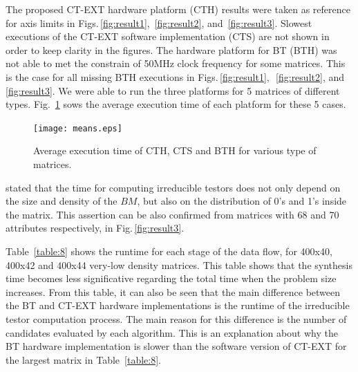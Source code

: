 \documentclass[authoryear,preprint,review,12pt]{elsarticle}
\begin{document}
The proposed CT-EXT hardware platform (CTH) results were taken as reference for axis limits in 
Figs.\,\ref{fig:result1}, \,\ref{fig:result2}, and \,\ref{fig:result3}.
Slowest executions of the CT-EXT software implementation (CTS) are not shown in order to keep clarity in 
the figures. 
The hardware platform for BT (BTH) was not able to met the constrain of 50MHz clock frequency for some 
matrices. 
This is the case for all missing BTH executions in Figs.\,\ref{fig:result1},~\,\ref{fig:result2}, and~\,\ref{fig:result3}. We were able to run the three platforms for 5 matrices of different types. 
Fig.~\ref{fig:means} sows the average execution time of each platform for these 5 cases.

\begin{figure}[htb]
    \begin{center}
       \texttt{[image: means.eps]}
    \end{center}
\caption{Average execution time of CTH, CTS and BTH for various type of matrices.}
\label{fig:means}
\end{figure}

\cite{R21} stated that the time for computing irreducible testors does not only depend on the size and 
density of the $BM$, but also on the distribution of 0's and 1's inside the matrix. This assertion can 
be also confirmed from matrices with 68 and 70 attributes respectively, in Fig.\,\ref{fig:result3}.

Table~\ref{table:8} shows the runtime for each stage of the data flow, for 
400x40, 400x42 and 400x44 very-low density matrices. This table shows that the synthesis time 
becomes less significative regarding the total time when the problem size increases. 
From this table, it can also be seen that the main difference between the BT and CT-EXT hardware 
implementations is the runtime of the irreducible testor computation process. The main reason for 
this difference is the number of candidates evaluated by each algorithm. This is an explanation 
about why the BT hardware implementation is slower than the software version of CT-EXT for the 
largest matrix in Table~\ref{table:8}.
\end{document}
